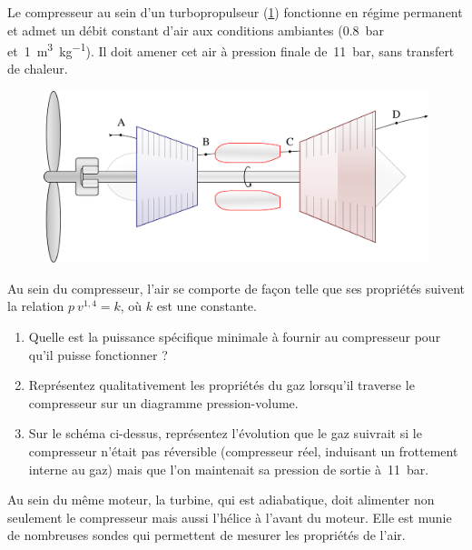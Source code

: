 	\wherefrom{[DS n°2 2012, 11 pts]}

	Le compresseur au sein d’un turbopropulseur (\cref{fig_turboprop}) fonctionne en régime permanent et admet un débit constant d’air aux conditions ambiantes (\SI{0,8}{\bar} et~\SI{1}{\metre\cubed\per\kilogram}). Il doit amener cet air à pression finale de~\SI{11}{\bar}, sans transfert de chaleur.
	
	\begin{figure}
		\begin{center}
			\includegraphics[width=12cm]{images/circuit_turboprop.png}
		\end{center}
		\label{fig_turboprop}
	\end{figure}

	
	Au sein du compresseur, l’air se comporte de façon telle que ses propriétés suivent la relation $p \ v^{1,4} = k$, où $k$ est une constante.

	\begin{enumerate}
		\item Quelle est la puissance spécifique minimale à fournir au compresseur pour qu’il puisse fonctionner ?
		\item Représentez qualitativement les propriétés du gaz lorsqu’il traverse le compresseur sur un diagramme pression-volume.
		\item Sur le schéma ci-dessus, représentez l’évolution que le gaz suivrait si le compresseur n’était pas réversible (compresseur réel, induisant un frottement interne au gaz) mais que l’on maintenait sa pression de sortie à~\SI{11}{\bar}.
	\end{enumerate}
	
	Au sein du même moteur, la turbine, qui est adiabatique, doit alimenter non seulement le compresseur mais aussi l’hélice à l’avant du moteur. Elle est munie de nombreuses sondes qui permettent de mesurer les propriétés de l’air.
	
